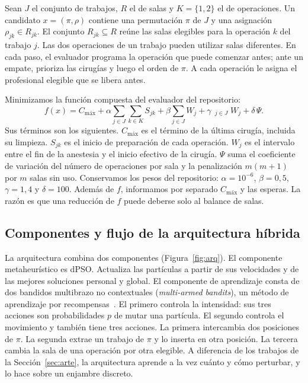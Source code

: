 \documentclass[10pt,a4paper]{article}
\DeclareMathOperator*{\maxop}{m\acute{a}x}
\newcommand{\Cmax}{C_{\text{máx}}}
\newcommand{\dc}{{,}}%
\begin{document}
Sean $J$ el conjunto de trabajos, $R$ el de salas y $K=\{1,2\}$ el de operaciones. Un candidato
$x=(\pi,\rho)$ contiene una permutación $\pi$ de $J$ y una asignación $\rho_{jk}\in R_{jk}$. El
conjunto $R_{jk}\subseteq R$ reúne las salas elegibles para la operación $k$ del trabajo $j$.
Las dos operaciones de un trabajo pueden utilizar salas diferentes. En cada paso, el evaluador
programa la operación que puede comenzar antes; ante un empate, prioriza las cirugías y luego el
orden de $\pi$. A cada operación le asigna el profesional elegible que se libera antes.

Minimizamos la función compuesta del evaluador del repositorio:
\begin{equation}
f(x)=\Cmax+\alpha\sum_{j\in J}\sum_{k\in K}S_{jk}+\beta\sum_{j\in J}W_j
+\gamma\,\maxop_{j\in J}W_j+\delta\,\Psi .
\label{eq:f}
\end{equation}
Sus términos son los siguientes. $\Cmax$ es el término de la última cirugía, incluida su
limpieza. $S_{jk}$ es el inicio de preparación de cada operación. $W_j$ es el intervalo entre
el fin de la anestesia y el inicio efectivo de la cirugía. $\Psi$ suma el coeficiente de
variación del número de operaciones por sala y la penalización $m(m+1)$ por $m$ salas sin uso.
Conservamos los pesos del repositorio: $\alpha=10^{-6}$, $\beta=0\dc5$, $\gamma=1\dc4$ y
$\delta=100$. Además de $f$, informamos por separado $\Cmax$ y las esperas. La razón es que
una reducción de $f$ puede deberse solo al balance de salas.

\subsection{Componentes y flujo de la arquitectura híbrida}

La arquitectura combina dos componentes (Figura~\ref{fig:arq}). El componente metaheurístico
es dPSO. Actualiza las partículas a partir de sus velocidades y de las mejores soluciones
personal y global. El componente de aprendizaje consta de dos bandidos multibrazo no
contextuales (\emph{multi-armed bandits}), un método de aprendizaje por
recompensas~\cite{sutton2018}. El primero controla la intensidad: sus tres acciones son
probabilidades $p$ de mutar una partícula. El segundo controla el movimiento y también tiene
tres acciones. La primera intercambia dos posiciones de $\pi$. La segunda extrae un trabajo de
$\pi$ y lo inserta en otra posición. La tercera cambia la sala de una operación por otra
elegible. A diferencia de los trabajos de la Sección~\ref{sec:arte}, la arquitectura aprende a
la vez cuánto y cómo perturbar, y lo hace sobre un enjambre discreto.
\end{document}
